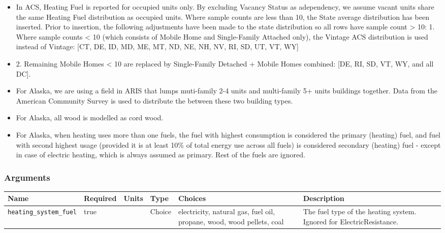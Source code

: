 \begin{itemize}
 
\item
  In ACS, Heating Fuel is reported for occupied units only. By excluding
  Vacancy Status as adependency, we assume vacant units share the same
  Heating Fuel distribution as occupied units. Where sample counts are
  less than 10, the State average distribution has been inserted. Prior
  to insertion, the following adjustments have been made to the state
  distribution so all rows have sample count \textgreater{} 10: 1. Where
  sample counts \textless{} 10 (which consists of Mobile Home and
  Single-Family Attached only), the Vintage ACS distribution is used
  instead of Vintage: {[}CT, DE, ID, MD, ME, MT, ND, NE, NH, NV, RI, SD,
  UT, VT, WY{]}
\item
  2. Remaining Mobile Homes \textless{} 10 are replaced by Single-Family
  Detached + Mobile Homes combined: {[}DE, RI, SD, VT, WY, and all
  DC{]}.
\item
  For Alaska, we are using a field in ARIS that lumps muti-family 2-4
  units and multi-family 5+ units buildings together. Data from the
  American Community Survey is used to distribute the between these two
  building types.
\item
  For Alaska, all wood is modelled as cord wood.
\item
  For Alaska, when heating uses more than one fuels, the fuel with
  highest consumption is considered the primary (heating) fuel, and fuel
  with second highest usage (provided it is at least 10\% of total
  energy use across all fuels) is considered secondary (heating) fuel -
  except in case of electric heating, which is always assumed as
  primary. Rest of the fuels are ignored.
\end{itemize}

\subsubsection{Arguments}\label{arguments-54}

\begin{longtable}[]{@{}llllll@{}}
\toprule\noalign{}
Name & Required & Units & Type & Choices & Description \\
\midrule\noalign{}
\endhead
\bottomrule\noalign{}
\endlastfoot
\texttt{heating\_system\_fuel} & true & & Choice & electricity, natural
gas, fuel oil, propane, wood, wood pellets, coal & The fuel type of the
heating system. Ignored for ElectricResistance. \\
\end{longtable}

